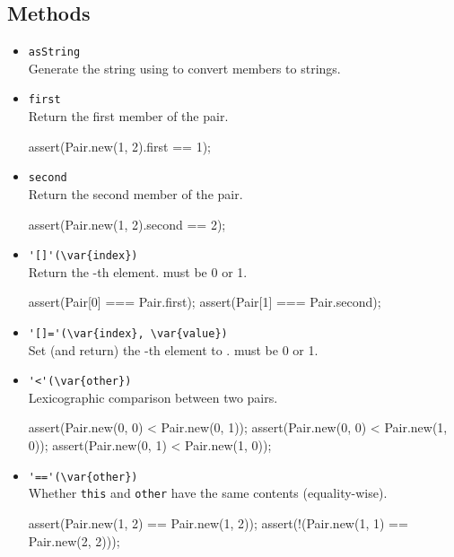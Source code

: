 \subsection{Methods}
\begin{itemize}
\item \lstinline|asString|\\
  Generate the string  using
   to convert members to strings.

\item \lstinline|first|\\
  Return the first member of the pair.
\begin{urbiscript}[firstnumber=last]
assert(Pair.new(1, 2).first == 1);
\end{urbiscript}

\item \lstinline|second|\\
  Return the second member of the pair.
\begin{urbiscript}[firstnumber=last]
assert(Pair.new(1, 2).second == 2);
\end{urbiscript}

\item \lstinline|'[]'(\var{index})|\\
  Return the -th element.   must be 0 or 1.
\begin{urbiscript}[firstnumber=last]
assert(Pair[0] === Pair.first);
assert(Pair[1] === Pair.second);
\end{urbiscript}

\item \lstinline|'[]='(\var{index}, \var{value})|\\
  Set (and return) the -th element to .
   must be 0 or 1.

\item \lstinline|'<'(\var{other})|\\
  Lexicographic comparison between two pairs.
\begin{urbiscript}[firstnumber=last]
assert(Pair.new(0, 0) < Pair.new(0, 1));
assert(Pair.new(0, 0) < Pair.new(1, 0));
assert(Pair.new(0, 1) < Pair.new(1, 0));
\end{urbiscript}

\item \lstinline|'=='(\var{other})|\\
  Whether \lstinline|this| and \lstinline|other| have the same
  contents (equality-wise).
\begin{urbiscript}[firstnumber=last]
assert(Pair.new(1, 2) == Pair.new(1, 2));
assert(!(Pair.new(1, 1) == Pair.new(2, 2)));
\end{urbiscript}
\end{itemize}



